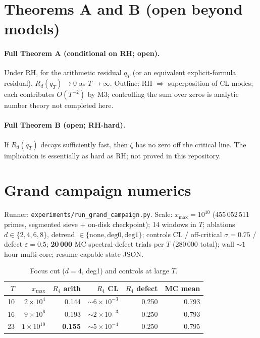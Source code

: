 \documentclass[11pt]{article}
\begin{document}
\section{Theorems A and B (open beyond models)}
\paragraph{Full Theorem A (conditional on RH; open).}
Under RH, for the arithmetic residual \(q_T\) (or an equivalent explicit-formula residual),
\(R_d(q_T)\to 0\) as \(T\to\infty\). Outline: RH \(\Rightarrow\) superposition of CL modes;
each contributes \(O(T^{-2})\) by M3; controlling the sum over zeros is analytic number theory
not completed here.

\paragraph{Full Theorem B (open; RH-hard).}
If \(R_d(q_T)\) decays sufficiently fast, then \(\zeta\) has no zero off the critical line.
The implication is essentially as hard as RH; not proved in this repository.

\section{Grand campaign numerics}
Runner: \texttt{experiments/run\_grand\_campaign.py}.
Scale: \(x_{\max}=10^{10}\) (455\,052\,511 primes, segmented sieve + on-disk checkpoint);
14 windows in \(T\); ablations \(d\in\{2,4,6,8\}\),
detrend \(\in\{\mathrm{none},\mathrm{deg0},\mathrm{deg1}\}\);
controls CL / off-critical \(\sigma{=}0.75\) / defect \(\varepsilon{=}0.5\);
\textbf{20\,000} MC spectral-defect trials per \(T\) (280\,000 total);
wall \(\sim 1\) hour multi-core; resume-capable state JSON.

\begin{table}[H]
\centering
\caption{Focus cut (\(d=4\), deg1) and controls at large \(T\).}
\small
\begin{tabular}{@{}rrrrrr@{}}
\toprule
\(T\) & \(x_{\max}\) & \(R_4\) arith & \(R_4\) CL & \(R_4\) defect & MC mean \\
\midrule
10 & \(2{\times}10^{4}\) & 0.144 & \({\sim}6{\times}10^{-3}\) & 0.250 & 0.793 \\
16 & \(9{\times}10^{6}\) & 0.193 & \({\sim}2{\times}10^{-3}\) & 0.250 & 0.793 \\
23 & \(1{\times}10^{10}\) & \textbf{0.155} & \({\sim}5{\times}10^{-4}\) & 0.250 & 0.795 \\
\bottomrule
\end{tabular}
\end{table}
\end{document}
